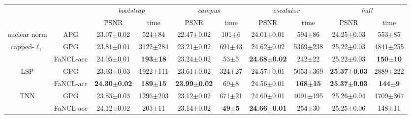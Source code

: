 \documentclass[10pt,journal,compsoc]{IEEEtran}
\begin{document}
\begin{table*}[ht]
\begin{tabular}{cc|cc|cc|cc|cc}
	\hline
	\multicolumn{2}{c|}{}         &    \multicolumn{2}{c|}{\textit{bootstrap}}    &      \multicolumn{2}{c|}{{\em campus}}      &     \multicolumn{2}{c|}{{\em escalator}}      &        \multicolumn{2}{c}{{\em hall}}         \\ 
	\multicolumn{2}{c|}{}         &          PSNR           &        time         &          PSNR           &       time        &          PSNR           &        time         &          PSNR           &        time         \\ \hline
	nuclear norm   &    \textsf{APG}    &     23.07$\pm$0.02      &     524$\pm$84      &     22.47$\pm$0.02      &     101$\pm$6     &     24.01$\pm$0.01      &     594$\pm$86      &     24.25$\pm$0.03      &     553$\pm$85      \\ \hline\hline
	capped-$\ell_1$ &    \textsf{GPG}    &     23.81$\pm$0.01      &    3122$\pm$284     &     23.21$\pm$0.02      &    691$\pm$43     &     24.62$\pm$0.02      &    5369$\pm$238     &     25.22$\pm$0.03      &    4841$\pm$255     \\ \cline{2-10}
	& \textsf{FaNCL-acc} &     24.05$\pm$0.01      & \textbf{193$\pm$18} &     23.24$\pm$0.02      &     53$\pm$5      & \textbf{24.68$\pm$0.02} &     242$\pm$22      &     25.22$\pm$0.03      & \textbf{150$\pm$10} \\ \hline
	LSP       &    \textsf{GPG}    &     23.93$\pm$0.03      &    1922$\pm$111     &     23.61$\pm$0.02      &    324$\pm$27     &     24.57$\pm$0.01      &    5053$\pm$369     & \textbf{25.37$\pm$0.03} &    2889$\pm$222     \\ \cline{2-10}
	& \textsf{FaNCL-acc} & \textbf{24.30$\pm$0.02} & \textbf{189$\pm$15} & \textbf{23.99$\pm$0.02} &     69$\pm$8      &     24.56$\pm$0.01      & \textbf{168$\pm$15} & \textbf{25.37$\pm$0.03} & \textbf{144$\pm$9}  \\ \hline
	TNN       &    \textsf{GPG}    &     23.85$\pm$0.03      &    1296$\pm$203     &     23.12$\pm$0.02      &    671$\pm$21     &     24.60$\pm$0.01      &    4091$\pm$195     &     25.26$\pm$0.04      &    4709$\pm$367     \\ \cline{2-10}
	& \textsf{FaNCL-acc} &     24.12$\pm$0.02      &     203$\pm$11      &     23.14$\pm$0.02      & \textbf{49$\pm$5} & \textbf{24.66$\pm$0.01} &     254$\pm$30      &     25.25$\pm$0.06      &     148$\pm$11      \\ \hline
\end{tabular}
\label{tab:videoPSNR}
\end{table*}
\end{document}
